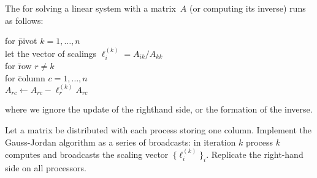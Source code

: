   \label{ex:gaussjordancoll}
  The  for solving a linear system
  with a matrix~$A$ (or computing its inverse) runs as follows:
  {\small
  \begin{tabbing}
    for \=pivot $k=1,\ldots,n$\\
    \>let the vector of scalings $\ell^{(k)}_i=A_{ik}/A_{kk}$\\
    \>for \=row $r\not=k$\\
    \>\>for \=column $c=1,\ldots,n$\\
    \>\>\> $A_{rc}\leftarrow A_{rc} - \ell^{(k)}_r A_{rc}$\\
  \end{tabbing}
  }
  where we ignore the update of the righthand side, or the formation
  of the inverse.

  Let a matrix be distributed with each process storing one
  column. Implement the Gauss-Jordan algorithm as a series of
  broadcasts: in iteration $k$ process $k$ computes and broadcasts the
  scaling vector~$\{\ell^{(k)}_i\}_i$. Replicate the right-hand side on
  all processors.

